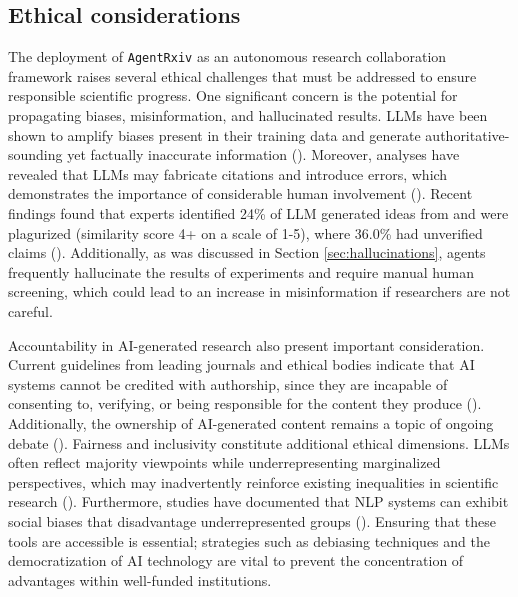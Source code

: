 \documentclass[11pt, a4paper]{include/gdm_format}
\begin{document}
\subsection{Ethical considerations}


The deployment of \texttt{AgentRxiv} as an autonomous research collaboration framework raises several ethical challenges that must be addressed to ensure responsible scientific progress. One significant concern is the potential for propagating biases, misinformation, and hallucinated results. LLMs have been shown to amplify biases present in their training data and generate authoritative-sounding yet factually inaccurate information (\cite{Bender2021StochasticParrots, Weidinger2021EthicalRisks}). Moreover, analyses have revealed that LLMs may fabricate citations and introduce errors, which demonstrates the importance of considerable human involvement (\cite{Walters2023ChatGPTCitations, Messeri2024Illusions}). Recent findings found that experts identified 24\% of LLM generated ideas from \cite{lu2024aiscientist} and \cite{si2024can} were plagurized (similarity score 4+ on a scale of 1-5), where 36.0\% had unverified claims (\cite{gupta2025all}). Additionally, as was discussed in Section \ref{sec:hallucinations}, agents frequently hallucinate the results of experiments and require manual human screening, which could lead to an increase in misinformation if researchers are not careful.


Accountability in AI-generated research also present important consideration. Current guidelines from leading journals and ethical bodies indicate that AI systems cannot be credited with authorship, since they are incapable of consenting to, verifying, or being responsible for the content they produce (\cite{Thorp2023NotAuthor, Lund2023AIauthorship, YeoThe2023AIauthorship}). Additionally, the ownership of AI-generated content remains a topic of ongoing debate (\cite{eshraghian2020human, jo2023promise}). Fairness and inclusivity constitute additional ethical dimensions. LLMs often reflect majority viewpoints while underrepresenting marginalized perspectives, which may inadvertently reinforce existing inequalities in scientific research (\cite{Santurkar2023Opinions}). Furthermore, studies have documented that NLP systems can exhibit social biases that disadvantage underrepresented groups (\cite{Hutchinson2020DisabilityBias}). Ensuring that these tools are accessible is essential; strategies such as debiasing techniques and the democratization of AI technology are vital to prevent the concentration of advantages within well-funded institutions.
\end{document}
